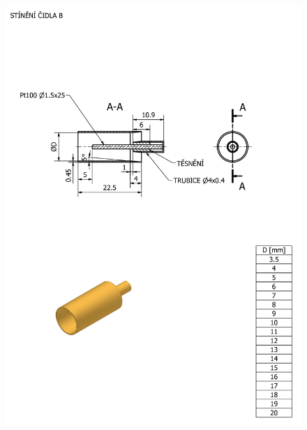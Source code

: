     \begin{figure}[ht!]
        \centering
        \includegraphics[width=\textwidth]{400_SIMULACE_KONSTRUKCNICH_UPRAV/Vykresy_rendery/Prumer_stineni_B_vykres.png}
        
    \end{figure}
    \newpage
{} \label{fig:prumer-stineni-A-vykres}
